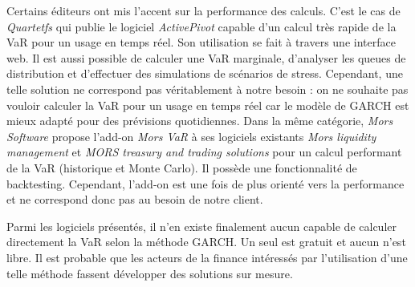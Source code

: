 		Certains éditeurs ont mis l'accent sur la performance des calculs. C'est le cas de \textit{Quartetfs} qui publie le logiciel \textit{ActivePivot} capable d'un calcul très rapide de la VaR pour un usage en temps réel. Son utilisation se fait à travers une interface web. Il est aussi possible de calculer une VaR marginale, d'analyser les queues de distribution et d'effectuer des simulations de scénarios de stress. Cependant, une telle solution ne correspond pas véritablement à notre besoin : on ne souhaite pas vouloir calculer la VaR pour un usage en temps réel car le modèle de GARCH est mieux adapté pour des prévisions quotidiennes.	Dans la même catégorie, \textit{Mors Software} propose l'add-on \textit{Mors VaR} à ses logiciels existants \textit{Mors liquidity management} et \textit{MORS treasury and trading solutions} pour un calcul performant de la VaR (historique et Monte Carlo). Il possède une fonctionnalité de backtesting. Cependant, l'add-on est une fois de plus orienté vers la performance et ne correspond donc pas au besoin de notre client.
		\nocite{website:Quartetfs}
		\nocite{website:MorsSoftware}

		Parmi les logiciels présentés, il n'en existe finalement aucun capable de calculer directement la VaR selon la méthode GARCH. Un seul est gratuit et aucun n'est libre. Il est probable que les acteurs de la finance intéressés par l'utilisation d'une telle méthode fassent développer des solutions sur mesure.